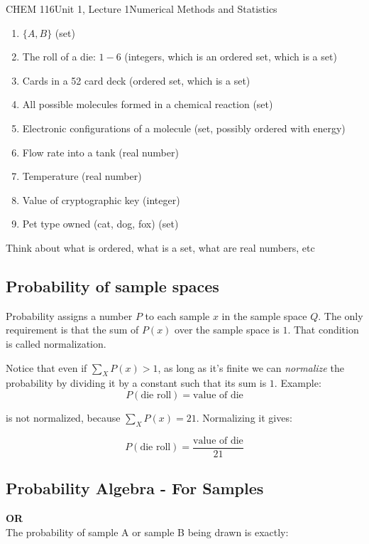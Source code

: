 \documentclass{article}
\begin{document}
\begin{tdoc}{CHEM 116}{Unit 1, Lecture 1}{Numerical Methods and Statistics}
\begin{enumerate}
\item $\{A, B\}$ (set)
\item The roll of a die: $1-6$ (integers, which is an ordered set, which is a set)
\item Cards in a 52 card deck (ordered set, which is a set)
\item All possible molecules formed in a chemical reaction (set)
\item Electronic configurations of a molecule (set, possibly ordered with energy)
\item Flow rate into a tank (real number)
\item Temperature (real number)
\item Value of cryptographic key (integer)
\item Pet type owned (cat, dog, fox) (set)

\end{enumerate}

Think about what is ordered, what is a set, what are real numbers, etc

\subsection{Probability of sample spaces}
Probability assigns a number $P$ to each sample $x$ in the sample
space $Q$. The only requirement is that the sum of $P(x)$ over the
sample space is $1$. That condition is called normalization.

Notice that even if $\sum_{X} P(x) > 1$, as long as it's finite we can
\emph{normalize} the probability by dividing it by a constant such
that its sum is $1$. Example:
\begin{equation}
P(\textrm{die roll}) = \textrm{value of die}
\end{equation}

is not normalized, because $\sum_X P(x) = 21$. Normalizing it gives:

\begin{equation}
P(\textrm{die roll}) = \frac{\textrm{value of die}}{21}
\end{equation}

\subsection{Probability Algebra - For Samples}

{\bf OR}\vspace{0.5cm}\\
The probability of sample A or sample B being drawn is exactly:


\end{tdoc}
\end{document}
